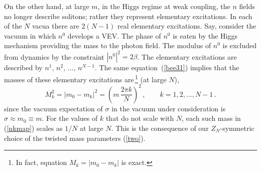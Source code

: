 \documentclass[epsfig,12pt]{article}
\def\beq{\begin{equation}}
\def\eeq{\end{equation}}
\def\beq{\begin{equation}}
\def\eeq{\end{equation}}
\begin{document}
{On the other hand, at large $m$, in the Higgs regime at weak coupling,  the $n$ fields no longer describe solitons;
rather they represent elementary excitations. In each of the $N$ vacua
there are $2(N-1)$
real elementary excitations. Say, consider the vacuum in which $n^0$ develops a VEV.
The phase of $n^0$ is eaten by the Higgs mechanism providing the mass to the photon field.
The modulus of $n^0$ is excluded from dynamics by the constraint $\left|n^0\right|^2=2\beta$.
The elementary excitations are described by $n^1,\,n^2,\, ... ,\, n^{N-1}$.
The same equation~(\ref{bee31}) implies that the masses of these elementary excitations are\,\footnote{In fact, 
equation $M_k= \left| m_0 - m_k\right|$ is exact.}
(at large $N$),
\beq
M_k^2 = \left| m_0 - m_k\right|^2=
\left(m\, \frac{2\pi k}{N}
\right)^2
\,,\qquad k=1, 2, ..., N-1\,.
\label{nkmap}
\eeq
since the vacuum expectation of $\sigma$ in the vacuum under consideration is $\sigma\approx m_0\equiv m$.
For the values of $k$ that do not scale with $N$, each such mass in (\ref{nkmap}) scales as $1/N$ at large $N$.
This is the consequence of our $Z_N$-symmetric choice of the twisted mass parameters
(\ref{two}). 


}
\end{document}
